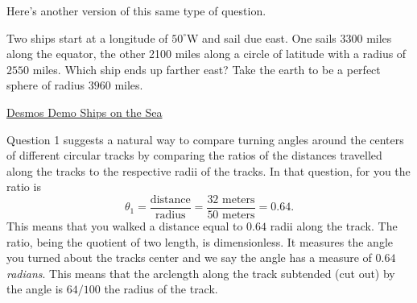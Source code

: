 \documentclass{ximera}
\newcommand{\pskip}{\vskip 0.1 in}
\begin{document}
Here's another version of this same type of question.





\begin{question}  \label{Q2543:Angles}
Two ships start at a longitude of $50^\circ$W and sail due east. One sails 3300 miles along the equator, the other 2100 miles along a circle of latitude with a radius of $2550$ miles. Which ship ends up farther east? Take the earth to be a perfect sphere of radius $3960$ miles.

\begin{onlineOnly}
    \begin{center}
\end{center}
\end{onlineOnly}


\href{https://www.desmos.com/3d/2f0ea20aec}{Desmos Demo Ships on the Sea}

\end{question}

Question 1 suggests a natural way to compare turning angles around the centers of different circular tracks by comparing the ratios of the distances travelled along the tracks to the respective radii of the tracks. In that question, for you the ratio is
\[
    \theta_1 = \frac{\text{distance}}{\text{radius}} = \frac{32 \text{ meters}}{50 \text{ meters}} = 0.64.
\]
This means that you walked a distance equal to $0.64$ radii along the track. The ratio, being the quotient of two length, is dimensionless. It measures the angle you turned about the tracks center and we say the angle has a measure of $0.64$ \emph{radians}. This means that the arclength along the track subtended (cut out) by the angle is $64/100$ the radius of the track.  
\end{document}
